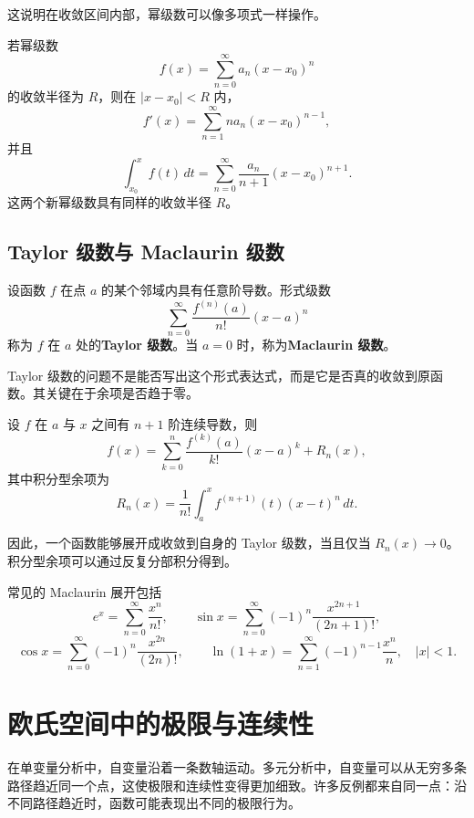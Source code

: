 这说明在收敛区间内部，幂级数可以像多项式一样操作。

\begin{theorem}[逐项求导与逐项积分]
若幂级数
\[
    f(x)=\sum_{n=0}^{\infty}a_n(x-x_0)^n
\]
的收敛半径为 $R$，则在 $|x-x_0|<R$ 内，
\[
    f'(x)=\sum_{n=1}^{\infty}na_n(x-x_0)^{n-1},
\]
并且
\[
    \int_{x_0}^{x}f(t)\,dt
    =\sum_{n=0}^{\infty}\frac{a_n}{n+1}(x-x_0)^{n+1}.
\]
这两个新幂级数具有同样的收敛半径 $R$。
\end{theorem}

\newpage

\subsection{Taylor 级数与 Maclaurin 级数}

\begin{definition}[Taylor 级数]
设函数 $f$ 在点 $a$ 的某个邻域内具有任意阶导数。形式级数
\[
    \sum_{n=0}^{\infty}\frac{f^{(n)}(a)}{n!}(x-a)^n
\]
称为 $f$ 在 $a$ 处的\textbf{Taylor 级数}。当 $a=0$ 时，称为\textbf{Maclaurin 级数}。
\end{definition}

Taylor 级数的问题不是能否写出这个形式表达式，而是它是否真的收敛到原函数。其关键在于余项是否趋于零。

\begin{theorem}[Taylor 公式]
设 $f$ 在 $a$ 与 $x$ 之间有 $n+1$ 阶连续导数，则
\[
    f(x)=\sum_{k=0}^{n}\frac{f^{(k)}(a)}{k!}(x-a)^k+R_n(x),
\]
其中积分型余项为
\[
    R_n(x)=\frac1{n!}\int_a^x f^{(n+1)}(t)(x-t)^n\,dt.
\]
\end{theorem}

因此，一个函数能够展开成收敛到自身的 Taylor 级数，当且仅当 $R_n(x)\to0$。积分型余项可以通过反复分部积分得到。

常见的 Maclaurin 展开包括
\[
    e^x=\sum_{n=0}^{\infty}\frac{x^n}{n!},
    \qquad
    \sin x=\sum_{n=0}^{\infty}(-1)^n\frac{x^{2n+1}}{(2n+1)!},
\]
\[
    \cos x=\sum_{n=0}^{\infty}(-1)^n\frac{x^{2n}}{(2n)!},
    \qquad
    \ln(1+x)=\sum_{n=1}^{\infty}(-1)^{n-1}\frac{x^n}{n},\quad |x|<1.
\]


\section{欧氏空间中的极限与连续性}

在单变量分析中，自变量沿着一条数轴运动。多元分析中，自变量可以从无穷多条路径趋近同一个点，这使极限和连续性变得更加细致。许多反例都来自同一点：沿不同路径趋近时，函数可能表现出不同的极限行为。


